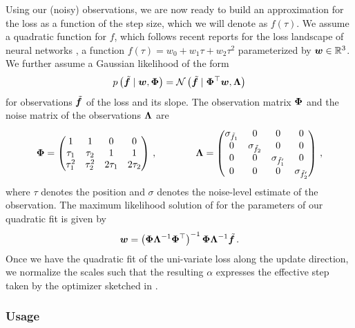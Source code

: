 Using our (noisy) observations, we are now ready to build an approximation for
the loss as a function of the step size, which we will denote as $f(\tau)$. We
assume a quadratic function for $f$, which follows recent reports for the loss
landscape of neural networks \citep{xing2018walk}, \ie a function $f(\tau) = w_0
+ w_1 \tau + w_2 \tau^2$ parameterized by ${\bm{w}} \in \mathbb{R}^3$. We further assume a
Gaussian likelihood of the form
\begin{align}
  \label{cockpit::eq:alpha_likelihood}
  p\left(\tilde{{\bm{f}}}\;|\;{\bm{w}}, {\bm{\Phi}}\right)
  =
  \mathcal{N}\left(\tilde{{\bm{f}}}\;|\; {\bm{\Phi}}^\top {\bm{w}}, {\bm{\Lambda}}\right)
\end{align}
for observations $\tilde{{\bm{f}}}$ of the loss and its slope. The observation matrix
${\bm{\Phi}}$ and the noise matrix of the observations ${\bm{\Lambda}}$ are
\begin{align*}
  {\bm{\Phi}} = \begin{pmatrix}
    1 & 1 & 0 & 0 \\
    \tau_1 & \tau_2  & 1 & 1 \\
    \tau_1^2 & \tau_2^2 & 2\tau_1 &  2\tau_2
  \end{pmatrix}\,,
                                    \qquad \qquad
                                    {\bm{\Lambda}} = \begin{pmatrix}
                                      \sigma_{\tilde{f}_1} & 0 & 0 & 0 \\ 0 & \sigma_{\tilde{f}_2} & 0 & 0  \\ 0
                                      & 0 & \sigma_{\tilde{f}'_1} & 0 \\ 0 & 0 & 0 & \sigma_{\tilde{f}'_2}
                                    \end{pmatrix} \, ,
\end{align*}
where $\tau$ denotes the position and $\sigma$ denotes the noise-level estimate
of the observation. The maximum likelihood solution of
 for the parameters of our quadratic fit is given by
\begin{align}
  \label{cockpit::eq:alpha-feature-table}
  {\bm{w}} = \left({\bm{\Phi}} {\bm{\Lambda}}^{-1}{\bm{\Phi}}^\top\right)^{-1}{\bm{\Phi}} {\bm{\Lambda}}^{-1}
  \tilde{{\bm{f}}} \, .
\end{align}
Once we have the quadratic fit of the uni-variate loss along the update
direction, we normalize the scales such that the resulting $\alpha$ expresses
the effective step taken by the optimizer sketched in
.

\subsubsection{Usage}

